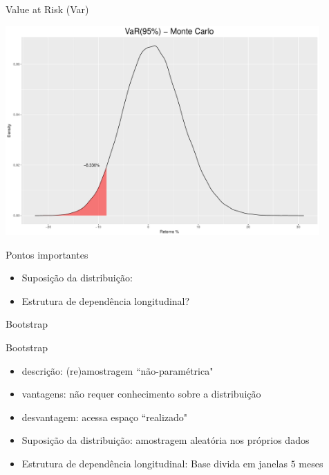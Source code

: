 \documentclass{beamer}
\begin{document}
\begin{frame}{Value at Risk (Var)}

\begin{center}
 \includegraphics[height=8cm,keepaspectratio]{VAR_mc.pdf}
 \end{center}
 
\end{frame}

\begin{frame}{Pontos importantes}
\begin{itemize}
\item Suposição da distribuição:
\item Estrutura de dependência longitudinal?
\end{itemize}
\end{frame}


\begin{frame}{Bootstrap}



\end{frame}



\begin{frame}{ Bootstrap}


\begin{itemize}
\item descrição: (re)amostragem ``não-paramétrica"
\item vantagens: não requer conhecimento sobre a distribuição
\item desvantagem: acessa espaço ``realizado"
\end{itemize}

\pause

\begin{itemize}
\item Suposição da distribuição: amostragem aleatória nos próprios dados
\item Estrutura de dependência longitudinal: Base divida em janelas $5$ meses
\end{itemize}
 
\end{frame}
\end{document}
